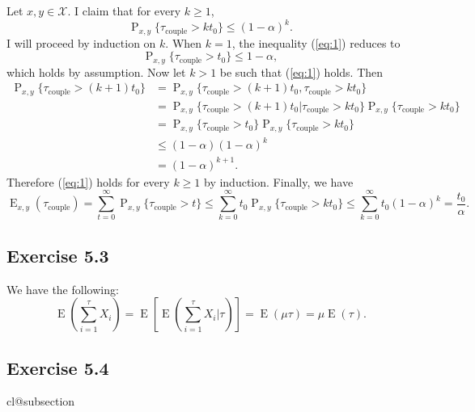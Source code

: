 \documentclass[12pt]{article}
\makeatletter
\def\nullstepcounter#1{%
	\begingroup
		\let\@elt\@stpelt
		\csname cl@#1\endcsname
	\endgroup}
\DeclareMathOperator{\E}{E}
\DeclareMathOperator{\Prob}{P}
\makeatother
\begin{document}
Let $x, y \in \mathcal{X}$. I claim that for every $k \geq 1$,
\begin{equation}
\Prob_{x, y}\{\tau_\mathrm{couple} > kt_0\} \leq (1 - \alpha)^k.
\end{equation}
I will proceed by induction on $k$. When $k = 1$, the inequality (\ref{eq:1}) reduces to
\begin{equation*}
\Prob_{x, y}\{\tau_\mathrm{couple} > t_0\} \leq 1 - \alpha,
\end{equation*}
which holds by assumption. Now let $k > 1$ be such that (\ref{eq:1}) holds. Then
\begin{align*}
\Prob_{x, y}\{\tau_\mathrm{couple} > (k+1)t_0\} &= \Prob_{x, y}\{\tau_\mathrm{couple} > (k+1)t_0, \tau_\mathrm{couple} > kt_0\} \\
&= \Prob_{x, y}\{\tau_\mathrm{couple} > (k+1)t_0 | \tau_\mathrm{couple} > kt_0\} \Prob_{x, y}\{\tau_\mathrm{couple} > kt_0\} \\
&= \Prob_{x, y}\{\tau_\mathrm{couple} > t_0\} \Prob_{x, y}\{\tau_\mathrm{couple} > kt_0\} \\
&\leq (1 - \alpha)(1 - \alpha)^k \\
&= (1 - \alpha)^{k+1}.
\end{align*}
Therefore (\ref{eq:1}) holds for every $k \geq 1$ by induction. Finally, we have
\begin{equation*}
\E_{x, y}(\tau_\mathrm{couple}) = \sum_{t=0}^\infty \Prob_{x, y}\{\tau_\mathrm{couple} > t\} \leq \sum_{k=0}^\infty t_0 \Prob_{x, y}\{\tau_\mathrm{couple} > kt_0\} \leq \sum_{k=0}^\infty t_0 (1 - \alpha)^k = \frac{t_0}{\alpha}.
\end{equation*}

\subsection*{Exercise 5.3}

We have the following:
\begin{equation*}
\E\left(\sum_{i=1}^\tau X_i\right) = \E\left[\E\left(\sum_{i=1}^\tau X_i \Bigg| \tau\right)\right] = \E(\mu \tau) = \mu \E(\tau).
\end{equation*}

\subsection*{Exercise 5.4}
\nullstepcounter{subsection}
\end{document}

